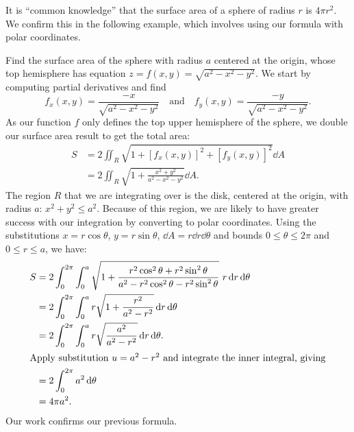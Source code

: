 It is ``common knowledge'' that the surface area of a sphere of radius $r$ is $4\pi r^2$. We confirm this in the following example, which involves using our formula with polar coordinates.

\begin{example}\label{ex_surfacearea2}%
Find the surface area of the sphere with radius $a$ centered at the origin, whose top hemisphere has equation $z=f(x,y)=\sqrt{a^2-x^2-y^2}$. 
\solution
We start by computing partial derivatives and find 
\[f_x(x,y) = \frac{-x}{\sqrt{a^2-x^2-y^2}} \quad \text{and}\quad f_y(x,y) = \frac{-y}{\sqrt{a^2-x^2-y^2}}.\]
As our function $f$ only defines the top upper hemisphere of the sphere, we double our surface area result to get the total area:
\begin{align*}
S & = 2\iint_R \sqrt{1+[f_x(x,y)]^2+[f_y(x,y)]^2}\dd A \\
		&= 2\iint_R \sqrt{1+ \frac{x^2+y^2}{a^2-x^2-y^2}}\dd A.
\end{align*}
The region $R$ that we are integrating over is the disk, centered at the origin, with radius $a$: $x^2+y^2\le a^2$. Because of this region, we are likely to have greater success with our integration by converting to polar coordinates. Using the substitutions $x=r\cos\theta$, $y=r\sin\theta$, $\dd A = r\dd r\dd\theta$ and bounds $0\leq\theta\leq2\pi$ and $0\leq r\leq a$, we have:
%
%
%
\begin{align}
S &= 2\int_0^{2\pi}\int_0^a \sqrt{1+\frac{r^2\cos^2\theta+r^2\sin^2\theta}{a^2-r^2\cos^2\theta-r^2\sin^2\theta}}\ r\dd r\dd\theta \notag\\
&=2\int_0^{2\pi}\int_0^ar\sqrt{1+\frac{r^2}{a^2-r^2}}\dd r\dd\theta\notag\\
&=2\int_0^{2\pi}\int_0^ar\sqrt{\frac{a^2}{a^2-r^2}}\dd r\dd\theta.\label{eq:exsurfacearea2}\\
\intertext{Apply substitution \intertextmath{u=a^2-r^2} and integrate the inner integral, giving}
&= 2\int_0^{2\pi} a^2\dd\theta\notag\\
&= 4\pi a^2\notag.
\end{align}
Our work confirms our previous formula.
\end{example}

